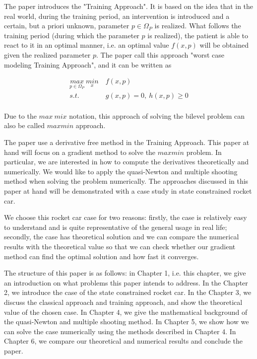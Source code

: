 The paper \cite{MatSch22} introduces the "Training Approach".  It is based on the idea that in the real world, during the training period, an intervention is introduced and a certain, but a priori unknown, parameter $p \in \Omega_P$ is realized. What follows the training period (during which the parameter $p$ is realized), the patient is able to react to it in an optimal manner, i.e. an optimal value $f(x,p)$ will be obtained given the  realized parameter $p$. The paper \cite{MatSch22} call this approach "worst case modeling Training Approach", and it can be written as 

\begin{equation}
	\begin{aligned}
		\underset{p \in \Omega_P}{max} \ \underset{x}{min} & \  f(x,p) \\ 
		s.t.  & \  g(x, p) = 0, \  h(x,p)  \geq  0 \\
	\end{aligned}
\end{equation}

Due to the $max \ mix$ notation, this approach of solving the bilevel problem can also be called $max min$ approach. 

The paper \cite{MatSch22} use a derivative free method in the Training Approach. This paper at hand will focus on a gradient method to solve the $maxmin$ problem.  In particular, we are interested in how to compute the derivatives theoretically and numerically.  We would like to apply the quasi-Newton and multiple shooting method when solving the problem numerically. The approaches discussed in this paper at hand will be demonstrated with a case study in state constrained rocket car. 

We choose this rocket car case for two reasons: firstly, the case is relatively easy to understand and is quite representative of the general usage in real life; secondly, the case has theoretical solution and we can compare the numerical results with the theoretical value so that we can check whether our gradient method can find the optimal solution and how fast it converges. 
 
The structure of this paper is as follows: in Chapter 1, i.e. this chapter,  we give an introduction on what problems this paper intends to address. In the Chapter 2, we introduce the case of the state constrained rocket car. In the Chapter 3, we discuss the classical approach and training approach, and show the theoretical value of the chosen case. In Chapter 4, we give the mathematical background of the quasi-Newton and multiple shooting method. In Chapter 5, we show how we can solve the case numerically using the methods described in Chapter 4. In Chapter 6, we compare our theoretical and numerical results and conclude the paper. 

\label{Chapter1}





